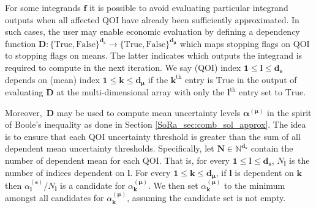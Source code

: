 \documentclass[graybox]{svmult}
\begin{document}
For some integrands $\boldsymbol{f}$ it is possible to avoid evaluating particular integrand outputs when all affected QOI have already been sufficiently approximated. In such cases, the user may enable economic evaluation by defining a dependency function $\boldsymbol{D}: \{\text{True},\text{False}\}^{\boldsymbol{d}_{\boldsymbol{s}}} \to \{\text{True},\text{False}\}^{\boldsymbol{d}_{\boldsymbol{\mu}}}$ which maps stopping flags on QOI to stopping flags on means. The latter indicates which outputs the integrand is required to compute in the next iteration.  We say (QOI) index $\boldsymbol{1} \leq \boldsymbol{l} \leq \boldsymbol{d}_{\boldsymbol{s}}$ depends on (mean) index $\boldsymbol{1} \leq \boldsymbol{k} \leq \boldsymbol{d}_{\boldsymbol{\mu}}$ if the $\boldsymbol{k}^\text{th}$ entry is $\text{True}$ in the output of evaluating $\boldsymbol{D}$ at the multi-dimensional array with only the $\boldsymbol{l}^\text{th}$ entry set to $\text{True}$.

Moreover, $\,\boldsymbol{D}$ may be used to compute mean uncertainty levels $\boldsymbol{\alpha}^{(\boldsymbol{\mu})}$ in the spirit of Boole's inequality as done in Section \ref{SoRa_sec:comb_sol_approx}. The idea is to ensure that each QOI uncertainty threshold is greater than the sum of all dependent mean uncertainty thresholds. Specifically, let $\boldsymbol{N} \in \mathbb{N}^{\boldsymbol{d}_{\boldsymbol{s}}}$ contain the number of dependent mean for each QOI. That is, for every $\boldsymbol{1} \leq \boldsymbol{l} \leq \boldsymbol{d}_{\boldsymbol{s}}$, $N_{\boldsymbol{l}}$ is the number of indices dependent on $\boldsymbol{l}$. For every $\boldsymbol{1} \leq \boldsymbol{k} \leq \boldsymbol{d}_{\boldsymbol{\mu}}$, if $\boldsymbol{l}$ is dependent on $\boldsymbol{k}$ then $\alpha_{\boldsymbol{l}}^{(\boldsymbol{s})}/N_{\boldsymbol{l}}$ is a candidate for $\alpha_{\boldsymbol{k}}^{(\boldsymbol{\mu})}$. We then set $\alpha_{\boldsymbol{k}}^{(\boldsymbol{\mu})}$ to the minimum amongst all candidates for $\alpha_{\boldsymbol{k}}^{(\boldsymbol{\mu})}$, assuming the candidate set is not empty.
\end{document}
